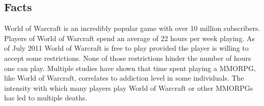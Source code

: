 \documentclass[11pt]{article}
\begin{document}
\newpage



\begin{multicols}{2}
\setcounter{page}{1}

\section{Facts}

World of Warcraft is an incredibly popular game with over 10 million subscribers. \cite{WoWPlayerCount} Players of World of Warcraft spend an average of 22 hours per week playing. \cite{PlayerMotivations} As of July 2011 World of Warcraft is free to play provided the player is willing to accept some restrictions. None of those restrictions hinder the number of hours one can play. \cite{StarterEditionFAQ} Multiple studies have shown that time spent playing a MMORPG, like World of Warcraft, correlates to addiction level in some individuals. \cite{ProblemUsageAmongHighlyEngagedPlayers}\cite{JustAComputerGameRight} The intensity with which many players play World of Warcraft or other MMORPGs has led to multiple deaths. \cite{SnowlyDeath}\cite{ShawnDeath}




\end{multicols}
\end{document}
